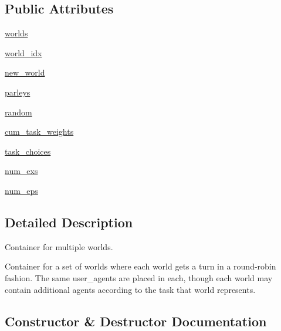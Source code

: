 \subsection*{Public Attributes}
\begin{DoxyCompactItemize}
\item 
\hyperlink{classparlai_1_1core_1_1worlds_1_1MultiWorld_afd4cbc3c724de6b6bf8f55e6fc56964e}{worlds}
\item 
\hyperlink{classparlai_1_1core_1_1worlds_1_1MultiWorld_a3d2a0158d96bed4eead1e3b4138d5242}{world\+\_\+idx}
\item 
\hyperlink{classparlai_1_1core_1_1worlds_1_1MultiWorld_ac88454a3fca862db7f00fb165b483dc5}{new\+\_\+world}
\item 
\hyperlink{classparlai_1_1core_1_1worlds_1_1MultiWorld_aa4332cdcbb6a8f91d55fbdeaa412cbe3}{parleys}
\item 
\hyperlink{classparlai_1_1core_1_1worlds_1_1MultiWorld_aa8e5d1fe78cd5ad37c142c95ff2a0a76}{random}
\item 
\hyperlink{classparlai_1_1core_1_1worlds_1_1MultiWorld_aa4264dd13f5d8e7f7883e3afd6d726e7}{cum\+\_\+task\+\_\+weights}
\item 
\hyperlink{classparlai_1_1core_1_1worlds_1_1MultiWorld_af84190b29a206943d32a09e70301a5a2}{task\+\_\+choices}
\item 
\hyperlink{classparlai_1_1core_1_1worlds_1_1MultiWorld_a97cb387aa6641126af73571731042ece}{num\+\_\+exs}
\item 
\hyperlink{classparlai_1_1core_1_1worlds_1_1MultiWorld_a6f874903b97f9bfd44354223ae38679e}{num\+\_\+eps}
\end{DoxyCompactItemize}


\subsection{Detailed Description}
\begin{DoxyVerb}Container for multiple worlds.

Container for a set of worlds where each world gets a turn in a round-robin fashion.
The same user_agents are placed in each, though each world may contain additional
agents according to the task that world represents.
\end{DoxyVerb}
 

\subsection{Constructor \& Destructor Documentation}
\mbox{\label{classparlai_1_1core_1_1worlds_1_1MultiWorld_abe32f537dd97543bbfdf51d417d81d9b}} 
